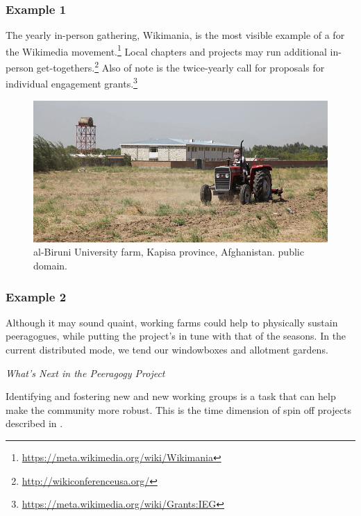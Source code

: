 \subsubsection*{Example 1} The yearly in-person gathering, Wikimania, is the most visible
example of a  for the Wikimedia movement.\footnote{\url{https://meta.wikimedia.org/wiki/Wikimania}}
Local chapters and projects may run additional in-person get-togethers.\footnote{\url{http://wikiconferenceusa.org/}}
Also of note is the twice-yearly call for proposals for individual
engagement grants.\footnote{\url{https://meta.wikimedia.org/wiki/Grants:IEG}}

\begin{figure}[t]
\includegraphics[width=\textwidth]{kapisa.png}
\caption{al-Biruni University farm, Kapisa province, Afghanistan. public domain.}
\end{figure}

\subsubsection*{Example 2} Although it may sound quaint, working farms could help to physically
sustain peeragogues, while putting the project's  in tune with that of the seasons.  In the
current distributed mode, we tend our windowboxes and allotment gardens.

\begin{framed}
\noindent 
\emph{What's Next in the Peeragogy Project}
\begin{collectinmacro}{\HeartbeatWN}{}{}
Identifying and fostering new  and new working groups is a task that can help make the community more robust.  This is the time dimension of spin off projects described in .
\end{collectinmacro}
\HeartbeatWN
\end{framed}

\newpage
